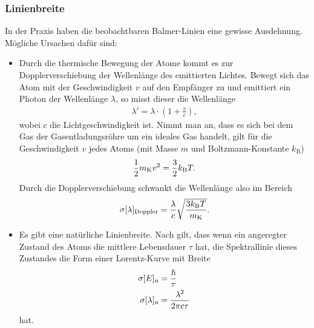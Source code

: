 \subsubsection{Linienbreite}
In der Praxis haben die beobachtbaren Balmer-Linien eine gewisse Ausdehnung. Mögliche Ursachen dafür sind:
\begin{itemize}
\item    
Durch die thermische Bewegung der Atome kommt es zur Dopplerverschiebung der Wellenlänge des emittierten Lichtes. Bewegt sich das Atom mit der Geschwindigkeit $v$ auf den Empfänger zu und emittiert ein Photon der Wellenlänge $\lambda$, so misst dieser die Wellenlänge 
\begin{align*}
  \lambda'=\lambda \cdot \left(  1+ \frac{v}{c} \right),
\end{align*} 
wobei $c$ die Lichtgeschwindigkeit ist. Nimmt man an, dass es sich bei dem Gas der Gasentladungsröhre um ein ideales Gas handelt, gilt für die Geschwindigkeit $v$ jedes Atoms (mit Masse $m$ und Boltzmann-Konstante $k_\mathrm{B}$)
\begin{align*}
  \frac{1}{2} m_\mathrm{K} v^2=\frac{3}{2} k_\mathrm{B} T.
\end{align*}
Durch die Dopplerverschiebung schwankt die Wellenlänge also im Bereich
\begin{align}
  \sigma[\lambda]_\mathrm{Doppler}=\frac{\lambda}{c}\sqrt{\frac{3k_\mathrm{B}T}{m_\mathrm{K}}}.
  \label{equ:doppler}
\end{align}
\item Es gibt eine natürliche Linienbreite. Nach \cite{unschaerfe} gilt, dass wenn ein angeregter Zustand des Atoms die mittlere Lebensdauer $\tau$ hat, die Spektrallinie dieses Zustandes die Form einer Lorentz-Kurve mit Breite 
\begin{align}
  \sigma[E]_\mathrm{n}&=\frac{\hbar}{\tau}\nonumber\\
  \sigma[\lambda]_\mathrm{n} &= \frac{\lambda^2}{2\pi c \tau}
  \label{equ:natbreite}
\end{align}
hat.
\end{itemize}
